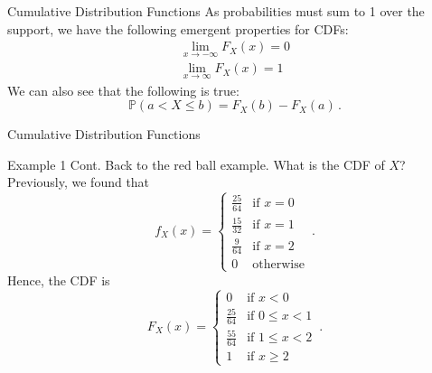 \documentclass[10pt]{beamer}
\begin{document}
\begin{frame}[fragile]{Cumulative Distribution Functions}
As probabilities must sum to 1 over the support, we have the following emergent properties for CDFs:
\begin{align*}
    \lim_{x\rightarrow-\infty}F_X\left(x\right) = 0\\
    \lim_{x\rightarrow\infty}F_X\left(x\right) = 1
\end{align*}
We can also see that the following is true:
\begin{equation*}
    \mathbb{P}\left(a < X \leq b\right) = F_X\left(b\right) - F_X\left(a\right)\,.
\end{equation*}
\end{frame}

\begin{frame}[fragile]{Cumulative Distribution Functions}
\begin{exampleblock}{Example 1 Cont.}
Back to the red ball example. What is the CDF of \(X\)? Previously, we found that
\begin{equation*}
    f_X\left(x\right) =
    \begin{cases}
        \frac{25}{64} & \text{if } x = 0\\
        \frac{15}{32} & \text{if } x = 1\\
        \frac{9}{64} & \text{if } x = 2\\
        0 & \text{otherwise}
    \end{cases}\,.
\end{equation*}
Hence, the CDF is
\begin{equation*}
    F_X\left(x\right) =
    \begin{cases}
        0 & \text{if } x < 0\\
        \frac{25}{64} & \text{if } 0 \leq x < 1\\
        \frac{55}{64} & \text{if } 1 \leq x < 2\\
        1 & \text{if } x \geq 2
    \end{cases}\,.
\end{equation*}
\end{exampleblock}
\end{frame}
\end{document}
